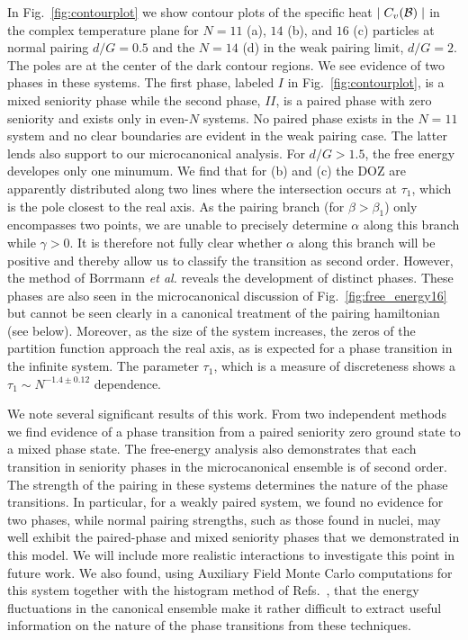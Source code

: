 \begin{multicols}{2}
In Fig.~\ref{fig:contourplot} we show contour 
plots of the specific heat $\mid C_v({\cal B})\mid $
in the complex temperature plane
for $N=11$ (a), $14$ (b), and $16$ (c) particles at normal 
pairing $d/G=0.5$ and
the $N=14$ (d) in the weak pairing limit, $d/G=2$. 
The poles are at the center of the dark contour regions.  We see evidence
of two phases in these systems. The first phase, labeled $I$ in 
Fig.~\ref{fig:contourplot}, is a mixed seniority phase while the 
second phase, $II$, is a paired phase with zero seniority and exists
only in even-$N$ systems.  No paired phase exists in 
the $N=11$ system and no clear boundaries are evident 
in the weak pairing case. 
The latter lends also support to our microcanonical analysis. For 
$d/G > 1.5$, the free energy developes only one minumum. 
We find that for (b) and (c) the 
DOZ are apparently distributed along two lines where the 
intersection occurs at $\tau_1$, which is the pole closest to 
the real axis. As the pairing branch (for $\beta >\beta_1$) 
only encompasses two points, we are unable to precisely 
determine $\alpha$ along this branch while $\gamma>0$. 
It is therefore not fully clear 
whether $\alpha$ 
along this branch will be positive and thereby allow us to classify
the transition as second order. However, the method 
of Borrmann {\em et al.} reveals the development 
of distinct phases. These
phases are also seen in the microcanonical discussion of
Fig.~\ref{fig:free_energy16} but cannot be seen clearly in a
canonical treatment of the pairing hamiltonian (see below). 
Moreover, as the size of the system
increases, the zeros of the partition function approach the real axis,
as is expected for a phase transition in the infinite system.   
The parameter $\tau_1$, which is a measure
of discreteness shows a $\tau_1\sim N^{-1.4 \pm 0.12}$ dependence. 

We note several significant results of this work. From two 
independent methods we find evidence of a phase 
transition from a  paired seniority
zero ground state to a mixed phase state. The free-energy
analysis also demonstrates that each transition in seniority phases in 
the microcanonical ensemble is of second order. The strength of the
pairing in these systems determines the nature of the phase transitions. 
In particular, for a weakly paired system, we found no evidence 
for two phases, while normal pairing strengths, such as those
found in nuclei, may well exhibit the paired-phase and mixed seniority
phases that we demonstrated in this model. We will include more realistic
interactions to investigate this point in future work. 
We also found, using Auxiliary Field Monte Carlo 
computations for this system \cite{kdl97} together 
with the histogram method of Refs.~\cite{prl90,fs88}, that the energy
fluctuations in the canonical ensemble 
make it rather difficult to extract useful information
on the nature of the phase transitions from these techniques. 


\end{multicols}
